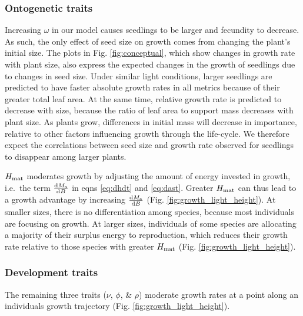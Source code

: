 \documentclass[a4paper,11pt]{article}
\begin{document}
\subsubsection{Ontogenetic traits}

Increasing $\omega$ in our model causes seedlings to be larger and fecundity to decrease. As such, the only effect of seed size on growth comes from changing the plant's initial  size. The plots in Fig. \ref{fig:conceptual}, which show changes in growth rate with plant size, also express the expected changes in the growth of seedlings due to changes in seed size. Under similar light conditions, larger seedlings are predicted to have faster absolute growth rates in all metrics  because of their greater total leaf area. At the same time, relative growth rate is predicted to decrease with size, because the ratio of leaf area to support mass decreases with plant size. As plants grow, differences in initial mass will decrease in importance, relative to other factors influencing growth through the life-cycle. We therefore expect the correlations between seed size and growth rate observed for seedlings to disappear among larger plants.

$H_{{\rm mat}}$ moderates growth by adjusting the amount of energy invested in growth, i.e.~the term $\frac{{\rm d}M_{\rm a}}{{\rm d}B}$ in eqns \ref{eq:dhdt} and \ref{eq:dast}. Greater $H_{{\rm mat}}$ can thus lead to a growth advantage by increasing $\frac{{\rm d}M_{\rm a}}{{\rm d}B}$ (Fig. \ref{fig:growth_light_height}). At smaller sizes, there is no differentiation among species, because most individuals are focusing on growth. At larger sizes, individuals of some species are allocating a majority of their surplus energy to reproduction, which reduces their growth rate relative to those species with greater $H_{{\rm mat}}$ (Fig. \ref{fig:growth_light_height}).

\subsubsection{Development traits}

The remaining three traits ($\nu$, $\phi$, \& $\rho$) moderate growth rates at a point along an individuals growth trajectory (Fig. \ref{fig:growth_light_height}).

\end{document}
